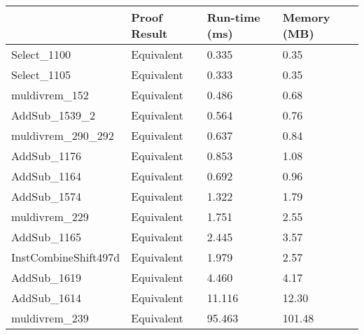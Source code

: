 \begin{tabular}{llll}
\toprule
 & Proof Result & Run-time (ms) & Memory (MB) \\
\midrule
Select\_1100 & Equivalent & 0.335 & 0.35 \\
Select\_1105 & Equivalent & 0.333 & 0.35 \\
muldivrem\_152 & Equivalent & 0.486 & 0.68 \\
AddSub\_1539\_2 & Equivalent & 0.564 & 0.76 \\
muldivrem\_290\_292 & Equivalent & 0.637 & 0.84 \\
AddSub\_1176 & Equivalent & 0.853 & 1.08 \\
AddSub\_1164 & Equivalent & 0.692 & 0.96 \\
AddSub\_1574 & Equivalent & 1.322 & 1.79 \\
muldivrem\_229 & Equivalent & 1.751 & 2.55 \\
AddSub\_1165 & Equivalent & 2.445 & 3.57 \\
InstCombineShift497d & Equivalent & 1.979 & 2.57 \\
AddSub\_1619 & Equivalent & 4.460 & 4.17 \\
AddSub\_1614 & Equivalent & 11.116 & 12.30 \\
muldivrem\_239 & Equivalent & 95.463 & 101.48 \\
\bottomrule
\end{tabular}
